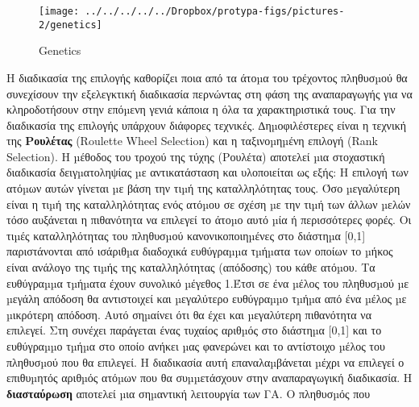   
  \begin{figure}
  	\centering
  	 \texttt{[image: ../../../../../Dropbox/protypa-figs/pictures-2/genetics]}
  	\caption{Genetics }
  	\label{fig:Genetics}
  \end{figure}
 Η διαδικασία της επιλογής καθορίζει ποια από τα άτοµα του τρέχοντος πληθυσµού θα συνεχίσουν την εξελεγκτική διαδικασία περνώντας στη φάση της αναπαραγωγής για να κληροδοτήσουν στην επόµενη γενιά κάποια η όλα τα χαρακτηριστικά τους. Για την διαδικασία της επιλογής υπάρχουν διάφορες τεχνικές. ∆ηµοφιλέστερες είναι η τεχνική της \textbf{Ρουλέτας} \label{roul} (Roulette Wheel Selection) και η ταξινοµηµένη επιλογή (Rank Selection). Η µέθοδος του τροχού της τύχης (Ρουλέτα) αποτελεί µια στοχαστική διαδικασία δειγµατοληψίας µε αντικατάσταση και υλοποιείται ως εξής:
 Η επιλογή των ατόµων αυτών γίνεται µε βάση την τιµή της καταλληλότητας τους. Όσο µεγαλύτερη είναι η τιµή της καταλληλότητας ενός ατόµου σε σχέση µε την τιµή των άλλων µελών τόσο αυξάνεται η πιθανότητα να επιλεγεί το άτοµο αυτό µία ή περισσότερες φορές. Οι τιµές καταλληλότητας του πληθυσµού κανονικοποιηµένες στο διάστηµα [0,1] παριστάνονται από ισάριθµα διαδοχικά ευθύγραµµα τµήµατα των οποίων το µήκος είναι ανάλογο της τιµής της καταλληλότητας (απόδοσης) του κάθε ατόµου. Τα ευθύγραµµα τµήµατα έχουν συνολικό µέγεθος 1.Έτσι σε ένα µέλος του πληθυσµού µε µεγάλη απόδοση θα αντιστοιχεί και µεγαλύτερο ευθύγραµµο τµήµα από ένα µέλος µε µικρότερη απόδοση. Αυτό σηµαίνει ότι θα έχει και µεγαλύτερη πιθανότητα να επιλεγεί. Στη συνέχει παράγεται ένας τυχαίος αριθµός στο διάστηµα [0,1] και το ευθύγραµµο τµήµα στο οποίο ανήκει µας φανερώνει και το αντίστοιχο µέλος του πληθυσµού που θα επιλεγεί. Η διαδικασία αυτή επαναλαµβάνεται µέχρι να επιλεγεί ο επιθυµητός αριθµός ατόµων που θα συµµετάσχουν στην αναπαραγωγική διαδικασία.
 \label {cross} Η \textbf{διασταύρωση} αποτελεί µια σηµαντική λειτουργία των ΓΑ. Ο πληθυσµός που

